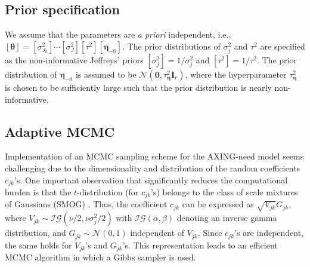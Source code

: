 \documentclass[aoas,preprint]{imsart}
\numberwithin{equation}{section}
\theoremstyle{plain}
\begin{document}
\subsection{Prior specification}

We assume that the parameters are \emph{a priori} independent, i.e., $[\bm{\theta}]=[\sigma_{J_0}^2]\cdots[\sigma_J^2][\tau^2][\bm{\eta}_{-0}]$.
The prior distributions of $\sigma_j^2$ and $\tau^2$ are specified as the non-informative Jeffreys' priors $[\sigma_j^2]=1/\sigma_j^2$ and $[\tau^2]=1/\tau^2$.
The prior distribution of $\bm{\eta}_{-0}$ is assumed to be $\mathcal{N}(\bm{0}, \tau^2_{\bm{\eta}}\textbf{I}_r)$, where the hyperparameter $\tau^2_{\bm{\eta}}$ is chosen to be sufficiently large such that the prior distribution is nearly non-informative.

\subsection{Adaptive MCMC}\label{sec:MCMC}

Implementation of an MCMC sampling scheme for the AXING-need model seems challenging due to the dimensionality and distribution of the random coefficients $c_{jk}$'s.
One important observation that significantly reduces the computational burden is that the $t$-distribution (for $c_{jk}$'s) belongs to the class of scale mixtures of Gaussians (SMOG) \citep{Andrews-74, West-87}. Thus, the coefficient $c_{jk}$ can be expressed as $\sqrt{V_{jk}}G_{jk}$, where
$V_{jk}\sim \mathcal{IG}(\nu/2, \nu\sigma_j^2/2)$
with $\mathcal{IG}(\alpha, \beta)$ denoting an inverse gamma distribution, and $G_{jk} \sim \mathcal{N}(0, 1)$ independent of $V_{jk}$. Since $c_{jk}$'s are independent, the same holds for $V_{jk}$'s and $G_{jk}$'s. This representation leads to an efficient MCMC algorithm in which a Gibbs sampler is used.
\end{document}

